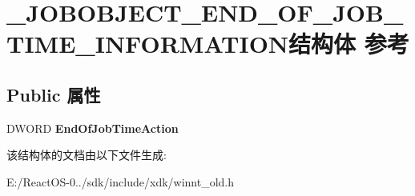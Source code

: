 \hypertarget{struct___j_o_b_o_b_j_e_c_t___e_n_d___o_f___j_o_b___t_i_m_e___i_n_f_o_r_m_a_t_i_o_n}{}\section{\+\_\+\+J\+O\+B\+O\+B\+J\+E\+C\+T\+\_\+\+E\+N\+D\+\_\+\+O\+F\+\_\+\+J\+O\+B\+\_\+\+T\+I\+M\+E\+\_\+\+I\+N\+F\+O\+R\+M\+A\+T\+I\+O\+N结构体 参考}
\label{struct___j_o_b_o_b_j_e_c_t___e_n_d___o_f___j_o_b___t_i_m_e___i_n_f_o_r_m_a_t_i_o_n}
\subsection*{Public 属性}
\begin{DoxyCompactItemize}
\item 
\mbox{\label{struct___j_o_b_o_b_j_e_c_t___e_n_d___o_f___j_o_b___t_i_m_e___i_n_f_o_r_m_a_t_i_o_n_afa5e3acae2f3aead7a099b3f5c4c460d}} 
D\+W\+O\+RD {\bfseries End\+Of\+Job\+Time\+Action}
\end{DoxyCompactItemize}


该结构体的文档由以下文件生成\+:\begin{DoxyCompactItemize}
\item 
E\+:/\+React\+O\+S-\/0../sdk/include/xdk/winnt\+\_\+old.\+h\end{DoxyCompactItemize}
